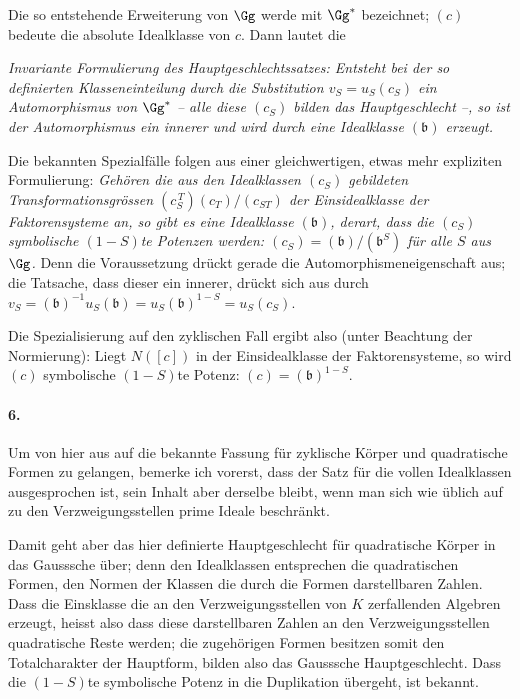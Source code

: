 Die so entstehende Erweiterung von \(\Gg\) werde mit \(\Gg^\ast\) bezeichnet; \((c)\) bedeute die absolute Idealklasse von \(c\). Dann lautet die

\emph{Invariante Formulierung des Hauptgeschlechtssatzes: Entsteht bei der so definierten Klasseneinteilung durch die Substitution \(v_S=u_S(c_S)\) ein Automorphismus von \(\Gg^\ast\) -- alle diese \((c_S)\) bilden das Hauptgeschlecht --, so ist der Automorphismus ein innerer und wird durch eine Idealklasse \((\mathfrak b)\) erzeugt.}

Die bekannten Spezialfälle folgen aus einer gleichwertigen, etwas mehr expliziten Formulierung: \emph{Gehören die aus den Idealklassen \((c_S)\) gebildeten Transformationsgrössen \((c_S^{\,T})(c_T)/(c_{ST})\) der Einsidealklasse der Faktorensysteme an, so gibt es eine Idealklasse \((\mathfrak b)\), derart, dass die \((c_S)\) symbolische \((1-S)\)te Potenzen werden: \((c_S)=(\mathfrak b)/(\mathfrak b^{S})\) für alle \(S\) aus \(\Gg\).} Denn die Voraussetzung drückt gerade die Automorphismeneigenschaft aus; die Tatsache, dass dieser ein innerer, drückt sich aus durch \(v_S=(\mathfrak b)^{-1}u_S(\mathfrak b)=u_S(\mathfrak b)^{1-S}=u_S(c_S)\).

Die Spezialisierung auf den zyklischen Fall ergibt also (unter Beachtung der Normierung): Liegt \(N([c])\) in der Einsidealklasse der Faktorensysteme, so wird \((c)\) symbolische \((1-S)\)te Potenz: \((c)=(\mathfrak b)^{1-S}\).

\paragraph{6.}
Um von hier aus auf die bekannte Fassung für zyklische Körper und quadratische Formen zu gelangen, bemerke ich vorerst, dass der Satz für die vollen Idealklassen ausgesprochen ist, sein Inhalt aber derselbe bleibt, wenn man sich wie üblich auf zu den Verzweigungsstellen prime Ideale beschränkt.

Damit geht aber das hier definierte Hauptgeschlecht für quadratische Körper in das Gausssche über; denn den Idealklassen entsprechen die quadratischen Formen, den Normen der Klassen die durch die Formen darstellbaren Zahlen. Dass die Einsklasse die an den Verzweigungsstellen von \(K\) zerfallenden Algebren erzeugt, heisst also dass diese darstellbaren Zahlen an den Verzweigungsstellen quadratische Reste werden; die zugehörigen Formen besitzen somit den Totalcharakter der Hauptform, bilden also das Gausssche Hauptgeschlecht. Dass die \((1-S)\)te symbolische Potenz in die Duplikation übergeht, ist bekannt.

